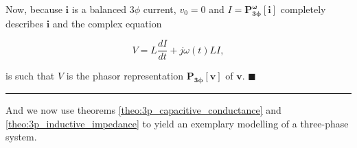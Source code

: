 	Now, because $\mathbf{i}$ is a balanced 3$\phi$ current, $v_0 = 0$ and $I = \mathbf{P^{\omega}_{3\phi}}\left[\mathbf{i}\right]$ completely describes $\mathbf{i}$ and the complex equation

\begin{equation} V = L\dfrac{dI}{dt} + j\omega(t)L I,  \end{equation}

	\noindent is such that $V$ is the phasor representation $\mathbf{P_{3\phi}}\left[\mathbf{v}\right]$ of $\mathbf{v}$.  \hfill$\blacksquare$

\vspace{5mm}
\hrule
\vspace{5mm}

	And we now use theorems \ref{theo:3p_capacitive_conductance} and \ref{theo:3p_inductive_impedance} to yield an exemplary modelling of a three-phase system.

